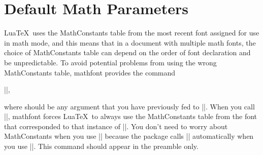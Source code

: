 \documentclass[12pt,twoside]{article}
\begin{document}
\section{Default Math Parameters}

Lua\TeX\ uses the MathConstants table from the most recent font assigned for use in math mode, and this means that in a document with multiple math fonts, the choice of MathConstants table can depend on the order of font declaration and be unpredictable. To avoid potential problems from using the wrong MathConstants table, \textsf{mathfont} provides the command
\begin{code}
||,
\end{code}
where  should be any argument that you have previously fed to |\mathfont|. When you call |\mathconstantsfont|, \textsf{mathfont} forces Lua\TeX\ to always use the MathConstants table from the font that corresponded to that instance of |\mathfont|. You don't need to worry about MathConstants when you use |\setfont| because the package calls |\mathconstantsfont| automatically when you use |\setfont|. This command should appear in the preamble only.
\end{document}
